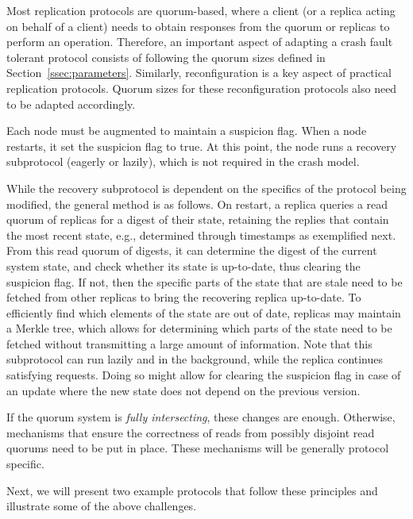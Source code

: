 Most replication protocols are quorum-based, where a client (or a
replica acting on behalf of a client) needs to obtain responses
from the quorum or replicas to perform an operation.  Therefore,
an important aspect of adapting a crash fault tolerant protocol
consists of following the quorum sizes defined in
Section~\ref{ssec:parameters}. Similarly, reconfiguration is a
key aspect of practical replication protocols. Quorum sizes for
these reconfiguration protocols also need to be adapted
accordingly.

Each node must be augmented to maintain a suspicion flag. When a node
restarts, it set the suspicion flag to true. At this point, the node
runs a recovery subprotocol (eagerly or lazily), which is not required
in the crash model.

While the recovery subprotocol is dependent on the specifics of
the protocol being modified, the general method is as follows. On
restart, a replica queries a read quorum of replicas for a digest
of their state, retaining the replies that contain the most
recent state, e.g., determined through timestamps as exemplified
next.  From this read quorum of digests, it can determine the
digest of the current system state, and check whether its state
is up-to-date, thus clearing the suspicion flag. If not, then the
specific parts of the state that are stale need to be fetched
from other replicas to bring the recovering replica up-to-date.
To efficiently find which elements of the state are out of date,
replicas may maintain a Merkle tree, which allows for determining
which parts of the state need to be fetched without transmitting
a large amount of information. Note that this subprotocol can run
lazily and in the background, while the replica continues
satisfying requests. Doing so might allow for clearing the
suspicion flag in case of an update where the new state does not
depend on the previous version.

If the quorum system is \emph{fully intersecting}, these changes
are enough. Otherwise, mechanisms that ensure the correctness of
reads from possibly disjoint read quorums need to be put in
place. These mechanisms will be generally protocol specific.


Next, we will present two example protocols that follow these
principles and illustrate some of the above challenges.

